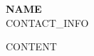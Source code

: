 \documentclass[letterpaper,11pt]{article}
\begin{document}
\begin{center}
    \textbf{\Huge \scshape {NAME}} \\ \vspace{1pt}
    \small CONTACT_INFO
\end{center}

{CONTENT}
\end{document}
